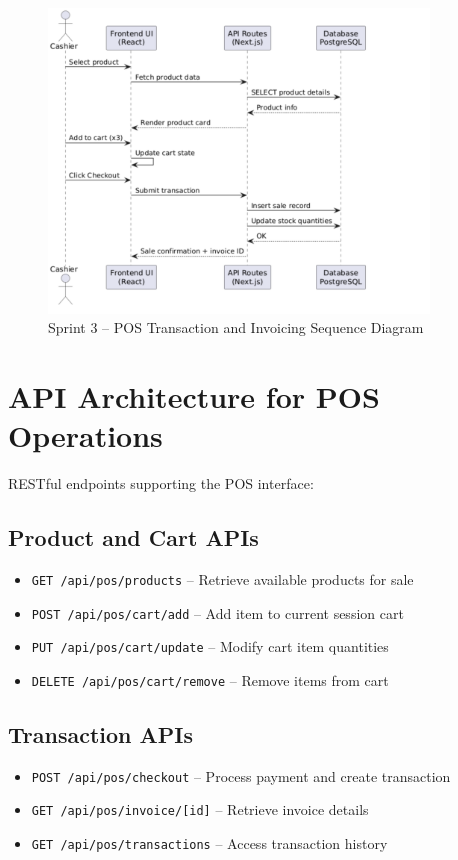 \begin{figure}[H]
  \centering
  \includegraphics[width=0.9\textwidth]{figures/images/sprint3sequence.png}
  \caption{Sprint 3 – POS Transaction and Invoicing Sequence Diagram}
  \label{fig:sprint3-sequence}
\end{figure}

\section{API Architecture for POS Operations}

RESTful endpoints supporting the POS interface:

\subsection*{Product and Cart APIs}
\begin{itemize}
  \item \texttt{GET /api/pos/products} – Retrieve available products for sale
  \item \texttt{POST /api/pos/cart/add} – Add item to current session cart
  \item \texttt{PUT /api/pos/cart/update} – Modify cart item quantities
  \item \texttt{DELETE /api/pos/cart/remove} – Remove items from cart
\end{itemize}

\subsection*{Transaction APIs}
\begin{itemize}
  \item \texttt{POST /api/pos/checkout} – Process payment and create transaction
  \item \texttt{GET /api/pos/invoice/[id]} – Retrieve invoice details
  \item \texttt{GET /api/pos/transactions} – Access transaction history
\end{itemize}

